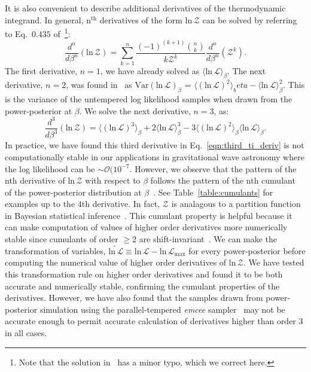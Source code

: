 It is also convenient to describe additional derivatives of the thermodynamic integrand. In general, $\mathrm{n}^{\mathrm{th}}$ derivatives of the form $\mathrm{ln} \, \mathcal{Z}$ can be solved by referring to Eq.~$0.435$ of~\cite{gradshteyn2015table}\footnote{Note that the solution in~\cite{gradshteyn2015table} has a minor typo, which we correct here.}:
\begin{equation}\label{eqn:gradshteyn_derivatives}
    \frac{d^n}{d\beta^n}\left( \mathrm{ln} \, \mathcal{Z} \right) = \sum_{k=1}^{n} \frac{(-1)^{(k+1)} {{n}\choose{k}}}{k \mathcal{Z}^k} \frac{d^n}{d\beta^n} \left(\mathcal{Z}^k\right).
\end{equation}
The first derivative, $n=1$, we have already solved as $\langle \mathrm{ln} \, \mathcal{L} \rangle_\beta$. The next derivative, $n=2$, was found in~\cite{friel2014improving} as $\mathrm{Var}(\mathrm{ln} \, \mathcal{L})_\beta$ = $\langle (\mathrm{ln} \, \mathcal{L})^2\rangle_beta - \langle \mathrm{ln} \, \mathcal{L} \rangle^2_\beta$. This is the variance of the untempered log likelihood samples when drawn from the power-posterior at $\beta$. We solve the next derivative, $n=3$, as:
\begin{equation}\label{eqn:third_ti_deriv}
    \frac{d^3}{d\beta^3}\left( \mathrm{ln} \, \mathcal{Z}\right) = \langle \left(\mathrm{ln} \, \mathcal{L} \right)^3\rangle_\beta + 2 \langle \mathrm{ln} \, \mathcal{L} \rangle^3_\beta - 3 \langle \left(\mathrm{ln} \, \mathcal{L} \right)^2\rangle_\beta \langle \mathrm{ln} \, \mathcal{L}\rangle_\beta.
\end{equation}
In practice, we have found this third derivative in Eq.~\ref{eqn:third_ti_deriv} is not computationally stable in our applications in gravitational wave astronomy where the log likelihood can be $\sim\mathcal{O}(10^{-7}$. However, we observe that the pattern of the nth derivative of $\mathrm{ln} \, \mathcal{Z}$ with respect to $\beta$ follows the pattern of the nth cumulant~\citep{kardar2007statistical} of the power-posterior distribution at $\beta$~\cite{carlson2016partition}. See Table~\ref{table:cumulants} for examples up to the $4$th derivative. In fact, $\mathcal{Z}$ is analagous to a partition function in Bayesian statistical inference~\citep{carlson2016partition, lamont2019correspondence}. This cumulant property is helpful because it can make computation of values of higher order derivatives more numerically stable since cumulants of order $\ge 2$ are shift-invariant~\cite{kardar2007statistical}. We can make the transformation of variables, $\widetilde{\mathrm{ln} \, \mathcal{L}} \equiv \mathrm{ln} \, \mathcal{L} - \mathrm{ln} \, \mathcal{L}_{\mathrm{max}}$ for every power-posterior before computing the numerical value of higher order derivatives of $\mathrm{ln} \, \mathcal{Z}$. We have tested this transformation rule on higher order derivatives and found it to be both accurate and numerically stable, confirming the cumulant properties of the derivatives. However, we have also found that the samples drawn from power-posterior simulation using the parallel-tempered \emph{emcee} sampler~\citep{emcee,vousden:2016} may not be accurate enough to permit accurate calculation of derivatives higher than order $3$ in all cases.

